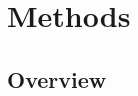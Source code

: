 \documentclass[a4paper,10pt]{article}
\newcommand{\idea}[1]{\textcolor{red}{#1}}
\begin{document}













\section{Methods} \label{methods}

\subsection{Overview}
\label{sec:overview}
\end{document}
